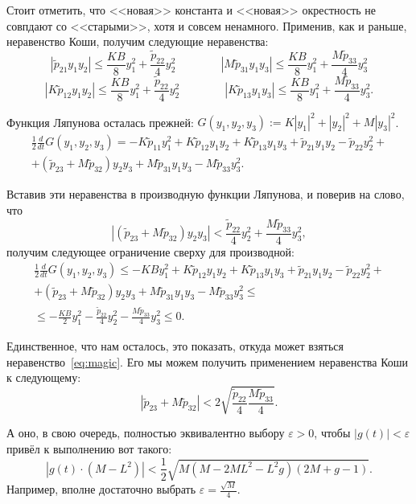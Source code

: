 \documentclass{article}
\begin{document}
Стоит отметить, что <<новая>> константа и <<новая>> окрестность не совпдают со <<старыми>>, хотя и совсем ненамного.
Применив, как и раньше, неравенство Коши, получим следующие неравенства:
$$
|\tilde p_{21}y_1y_2|\leqslant \frac{KB}{8}y_1^2+\frac{\tilde p_{22}}{4}y_2^2  \qquad \qquad |M\tilde p_{31}y_1y_3|\leqslant \frac{KB}{8}y_1^2+\frac{M\tilde p_{33}}{4}y_3^2
$$
$$
|K\tilde p_{12}y_1y_2|\leqslant \frac{KB}{8}y_1^2+\frac{\tilde p_{22}}{4}y_2^2  \qquad  \qquad 
|K\tilde p_{13}y_1y_3|\leqslant \frac{KB}{8}y_1^2+\frac{M\tilde  p_{33}}{4}y_3^2.
$$

Функция Ляпунова осталась прежней: $G(y_1,y_2,y_3):=K|y_1|^2+|y_2|^2+M|y_3|^2$.
\begin{multline*}
\frac{1}{2}\frac{d}{dt} G(y_1,y_2,y_3)=-K\tilde p_{11}y_1^2+K\tilde p_{12}y_1y_2+K\tilde p_{13}y_1y_3+\tilde p_{21}y_1y_2-\tilde p_{22}y_2^2+
\\
+(\tilde p_{23}+M\tilde p_{32})y_2y_3+M\tilde p_{31}y_1y_3-M\tilde p_{33}y_3^2.
\end{multline*}

Вставив эти неравенства в производную функции Ляпунова, и поверив на слово, что 
\begin{equation}
|(\tilde p_{23}+M\tilde p_{32})y_2y_3| < \frac{\tilde p_{22}}{4} y_2^2+\frac{M \tilde p_{33}}{4}y_3^2, 
\label{eq:magic}
\end{equation}
получим следующее ограничение сверху для производной:
\begin{multline}
\nonumber
\frac{1}{2}\frac{d}{dt} G(y_1,y_2,y_3)\leqslant -KBy_1^2+K\tilde p_{12}y_1y_2+K\tilde p_{13}y_1y_3+\tilde p_{21}y_1y_2-\tilde p_{22}y_2^2+ \\
+(\tilde p_{23}+M\tilde p_{32})y_2y_3+M\tilde p_{31}y_1y_3-M\tilde p_{33}y_3^2 \leqslant \\
\leqslant
-\frac{KB}{2}y_1^2-\frac{\tilde p_{22}}{4}y_2^2-\frac{M\tilde p_{33}}4 y_3^2\leqslant 0.
\end{multline}

Единственное, что нам осталось, это показать, откуда может взяться неравенство~\ref{eq:magic}. Его мы можем получить применением неравенства Коши к следующему:
$$
|\tilde p_{23}+M\tilde p_{32}|<2\sqrt{\frac{\tilde p_{22}}{4}\frac{M \tilde p_{33}}{4}}.
$$

А оно, в свою очередь, полностью эквивалентно выбору $\varepsilon>0$, чтобы $|g(t)|<\varepsilon$ привёл к выполнению вот такого:
$$
|g(t)\cdot(M-L^2)|<\frac{1}{2}\sqrt{M(M-2ML^2-L^2g)(2M+g-1)}.
$$
Например, вполне достаточно выбрать $\varepsilon=\frac{\sqrt{M}}{4}$.
\end{document}
